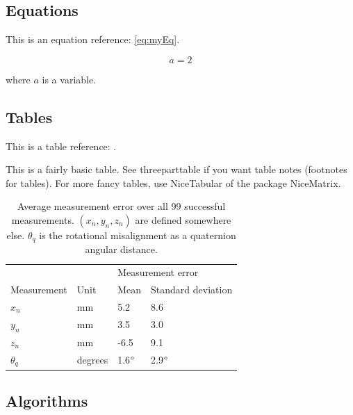 \subsection{Equations}
This is an equation reference: \eqref{eq:myEq}.

\begin{equation} \label{eq:myEq}
    a = 2
\end{equation}

where $a$ is a variable.


\subsection{Tables}

This is a table reference: .

This is a fairly basic table. See threeparttable if you want table notes (footnotes for tables). For more fancy tables, use NiceTabular of the package NiceMatrix.

\begin{table}[!h]
    \centering
    \begin{tabular}{llll}
        \hline
        & & \multicolumn{2}{l}{Measurement error}\\
        Measurement & Unit & Mean & Standard deviation\\
        \hline
        $x_n$ & mm & 5.2 & 8.6\\
        $y_n$ & mm & 3.5 & 3.0\\
        $z_n$ & mm & -6.5 & 9.1\\
        $\theta_q$ & degrees & 1.6$\degree$ & 2.9$\degree$\\
        \hline
        \end{tabular}
    \caption{Average measurement error over all 99 successful measurements. $(x_n, y_n, z_n)$ are defined somewhere else. $\theta_q$ is the rotational misalignment as a quaternion angular distance.}
    \label{tb:myTable}
\end{table}


\subsection{Algorithms}

